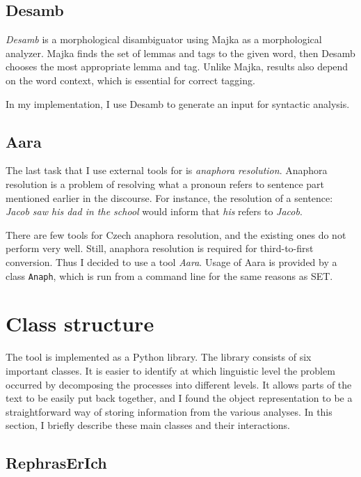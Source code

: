 \subsection{Desamb} \label{sec:desamb}

\emph{Desamb} is a morphological disambiguator using Majka as a morphological analyzer. Majka finds the set of lemmas and tags to the given word, then Desamb chooses the most appropriate lemma and tag. Unlike Majka, results also depend on the word context, which is essential for correct tagging.

In my implementation, I use Desamb to generate an input for syntactic analysis.

\subsection{Aara} \label{sec:aara}

The last task that I use external tools for is \emph{anaphora resolution}. Anaphora resolution is a problem of resolving what a pronoun refers to sentence part mentioned earlier in the discourse. For instance, the resolution of a sentence: \emph{Jacob saw his dad in the school} would inform that \emph{his} refers to \emph{Jacob}.

There are few tools for Czech anaphora resolution, and the existing ones do not perform very well. Still, anaphora resolution is required for third-to-first conversion. Thus I decided to use a tool \emph{Aara}. Usage of Aara is provided by a class \texttt{Anaph}, which is run from a command line for the same reasons as SET.

\section{Class structure}

The tool is implemented as a Python library. The library consists of six important classes. It is easier to identify at which linguistic level the problem occurred by decomposing the processes into different levels. It allows parts of the text to be easily put back together, and I found the object representation to be a straightforward way of storing information from the various analyses. In this section, I briefly describe these main classes and their interactions.

\subsection{RephrasErIch}

